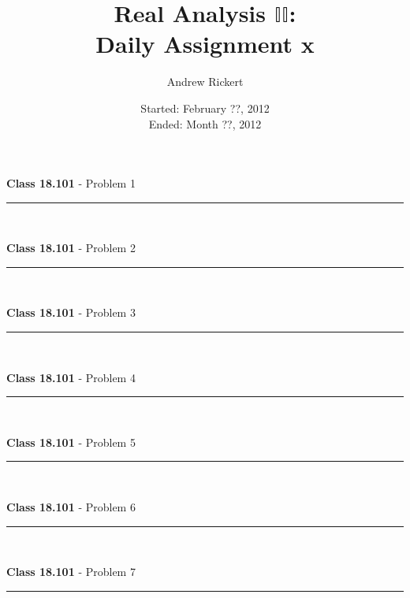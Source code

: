 \documentclass[11pt,reqno]{article}
\title{Real Analysis $\mathbb{II}$: \\ Daily Assignment x}
\author{Andrew Rickert}
\date{Started: February ??, 2012 \\ \hspace{1pt} Ended: Month ??,  2012}                                           %
\begin{document}
\maketitle


\begin{flushleft} 
\textbf{Class 18.101} - Problem 1\\
\rule{500pt}{1pt}\\
\end{flushleft} 

\vspace{15pt}
\begin{flushleft} 
\textbf{Class 18.101} - Problem 2\\
\rule{500pt}{1pt}\\
\end{flushleft} 



\vspace{15pt}
\begin{flushleft} 
\textbf{Class 18.101} - Problem 3\\
\rule{500pt}{1pt}\\
\end{flushleft} 

 
\vspace{15pt}
\begin{flushleft} 
\textbf{Class 18.101} - Problem 4\\
\rule{500pt}{1pt}\\
\end{flushleft} 


\vspace{15pt}
\begin{flushleft} 
\textbf{Class 18.101} - Problem 5\\
\rule{500pt}{1pt}\\
\end{flushleft} 


\vspace{15pt}
\begin{flushleft} 
\textbf{Class 18.101} - Problem 6\\
\rule{500pt}{1pt}\\
\end{flushleft} 


\vspace{15pt}
\begin{flushleft} 
\textbf{Class 18.101} - Problem 7\\
\rule{500pt}{1pt}\\
\end{flushleft} 
\end{document}
